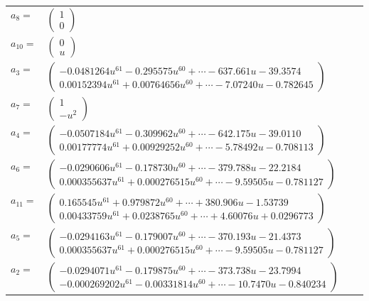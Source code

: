 \documentclass[1p]{elsarticle_modified}
\theoremstyle{definition}
\begin{document}
\begin{tabular}{m{7pt} m{180pt} m{7pt} m{180pt} }
\flushright $a_{8}=$&$\begin{pmatrix}1\\0\end{pmatrix}$ \\
\flushright $a_{10}=$&$\begin{pmatrix}0\\u\end{pmatrix}$ \\
\flushright $a_{3}=$&$\begin{pmatrix}-0.0481264 u^{61}-0.295575 u^{60}+\cdots-637.661 u-39.3574\\0.00152394 u^{61}+0.00764656 u^{60}+\cdots-7.07240 u-0.782645\end{pmatrix}$ \\
\flushright $a_{7}=$&$\begin{pmatrix}1\\- u^2\end{pmatrix}$ \\
\flushright $a_{4}=$&$\begin{pmatrix}-0.0507184 u^{61}-0.309962 u^{60}+\cdots-642.175 u-39.0110\\0.00177774 u^{61}+0.00929252 u^{60}+\cdots-5.78492 u-0.708113\end{pmatrix}$ \\
\flushright $a_{6}=$&$\begin{pmatrix}-0.0290606 u^{61}-0.178730 u^{60}+\cdots-379.788 u-22.2184\\0.000355637 u^{61}+0.000276515 u^{60}+\cdots-9.59505 u-0.781127\end{pmatrix}$ \\
\flushright $a_{11}=$&$\begin{pmatrix}0.165545 u^{61}+0.979872 u^{60}+\cdots+380.906 u-1.53739\\0.00433759 u^{61}+0.0238765 u^{60}+\cdots+4.60076 u+0.0296773\end{pmatrix}$ \\
\flushright $a_{5}=$&$\begin{pmatrix}-0.0294163 u^{61}-0.179007 u^{60}+\cdots-370.193 u-21.4373\\0.000355637 u^{61}+0.000276515 u^{60}+\cdots-9.59505 u-0.781127\end{pmatrix}$ \\
\flushright $a_{2}=$&$\begin{pmatrix}-0.0294071 u^{61}-0.179875 u^{60}+\cdots-373.738 u-23.7994\\-0.000269202 u^{61}-0.00331814 u^{60}+\cdots-10.7470 u-0.840234\end{pmatrix}$ \\

\end{tabular}
\end{document}
